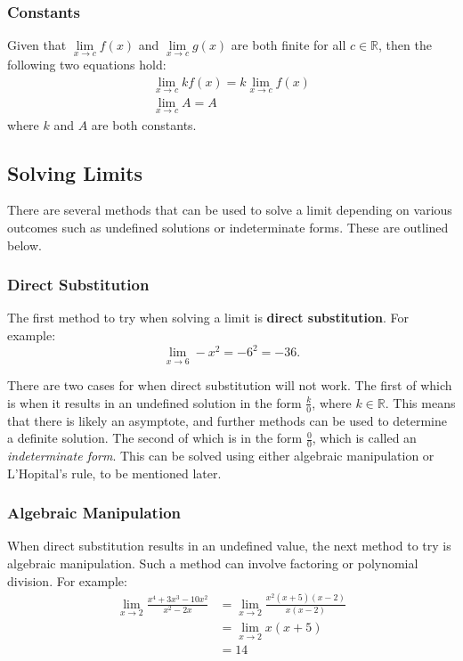 \documentclass[12pt]{article}
\newcommand{\R}{\mathbb{R}} %
\begin{document}
\subsubsection{Constants}
Given that $\lim \limits_{x \to c} f(x)$ and $\lim \limits_{x \to c} g(x)$ are both finite for all $c \in \R$, then the following two equations hold:
\begin{gather*}
	\lim_{x \to c} k f(x) = k \lim_{x \to c} f(x) \\
	\lim_{x \to c} A = A
\end{gather*}
where $k$ and $A$ are both constants.

\subsection{Solving Limits}
There are several methods that can be used to solve a limit depending on various outcomes such as undefined solutions or indeterminate forms. These are outlined below.

\subsubsection{Direct Substitution}
The first method to try when solving a limit is \textbf{direct substitution}. For example:
\[ \lim_{x \to 6} -x^2 = -6^2 = -36. \]

There are two cases for when direct substitution will not work. The first of which is when it results in an undefined solution in the form $\frac{k}{0}$, where $k \in \R$. This means that there is likely an asymptote, and further methods can be used to determine a definite solution. The second of which is in the form $\frac{0}{0}$, which is called an \textit{indeterminate form}. This can be solved using either algebraic manipulation or L'Hopital's rule, to be mentioned later.

\subsubsection{Algebraic Manipulation}
When direct substitution results in an undefined value, the next method to try is algebraic manipulation. Such a method can involve factoring or polynomial division. For example:
\begin{align*}
	\lim_{x \to 2} \frac{x^4 + 3x^3 - 10x^2}{x^2 - 2x} & = \lim_{x \to 2} \frac{x^2 (x + 5)(x - 2)}{x(x - 2)} \\[5pt]
	&= \lim_{x \to 2} x(x + 5) \\
	&= 14
\end{align*}
\end{document}
